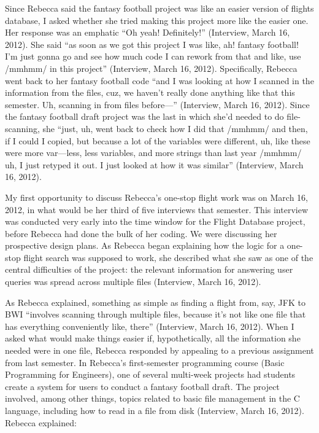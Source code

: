 Since Rebecca said the fantasy football project was like an easier version of flights database, I asked whether she tried making this project more like the easier one. Her response was an emphatic ``Oh yeah! Definitely!'' (Interview, March 16, 2012). She said ``as soon as we got this project I was like, ah! fantasy football! I'm just gonna go and see how much code I can rework from that and like, use /mmhmm/ in this project'' (Interview, March 16, 2012). Specifically, Rebecca went back to her fantasy football code ``and I was looking at how I scanned in the information from the files, cuz, we haven't really done anything like that this semester. Uh, scanning in from files before---'' (Interview, March 16, 2012). Since the fantasy football draft project was the last in which she'd needed to do file-scanning, she ``just, uh, went back to check how I did that /mmhmm/ and then, if I could I copied, but because a lot of the variables were different, uh, like these were more var---less, less variables, and more strings than last year /mmhmm/ uh, I just retyped it out. I just looked at how it was similar'' (Interview, March 16, 2012).

My first opportunity to discuss Rebecca's one-stop flight work was on March 16, 2012, in what would be her third of five interviews that semester. This interview was conducted very early into the time window for the Flight Database project, before Rebecca had done the bulk of her coding. We were discussing her prospective design plans. As Rebecca began explaining how the logic for a one-stop flight search was supposed to work, she described what she saw as one of the central difficulties of the project: the relevant information for answering user queries was spread across multiple files (Interview, March 16, 2012).

As Rebecca explained, something as simple as finding a flight from, say, JFK to BWI ``involves scanning through multiple files, because it's not like one file that has everything conveniently like, there'' (Interview, March 16, 2012). When I asked what would make things easier if, hypothetically, all the information she needed were in one file, Rebecca responded by appealing to a previous assignment from last semester. In Rebecca's first-semester programming course (Basic Programming for Engineers), one of several multi-week projects had students create a system for users to conduct a fantasy football draft. The project involved, among other things, topics related to basic file management in the C language, including how to read in a file from disk (Interview, March 16, 2012). Rebecca explained:

